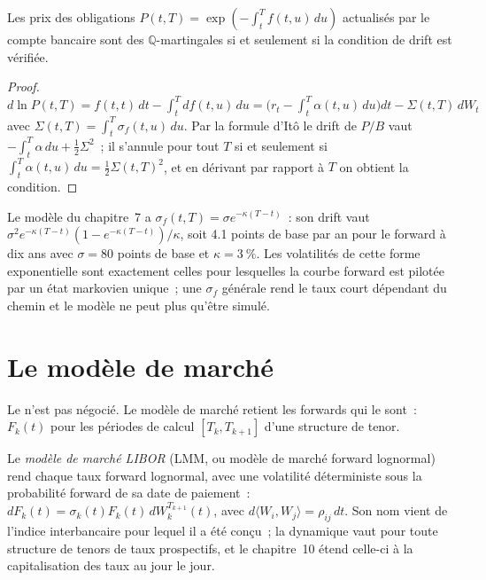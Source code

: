 \begin{proposition}\label{prop:rc:forward-rate-and-market-models:drift}
Les prix des obligations $P(t,T) = \exp(-\int_t^Tf(t,u)\,du)$ actualisés par le compte bancaire
sont des $\mathbb Q$-martingales si et seulement si la condition de drift est vérifiée.
\end{proposition}
\begin{proof}
$d\ln P(t,T) = f(t,t)\,dt-\int_t^Td f(t,u)\,du = \bigl(r_t-\int_t^T\alpha(t,u)\,du\bigr)dt
-\Sigma(t,T)\,dW_t$ avec $\Sigma(t,T)=\int_t^T\sigma_f(t,u)\,du$. Par la formule d'Itô
le drift de $P/B$ vaut $-\int_t^T\alpha\,du+\frac12\Sigma^2$~; il s'annule pour tout
$T$ si et seulement si $\int_t^T\alpha(t,u)\,du = \frac12\Sigma(t,T)^2$, et en dérivant par rapport à $T$
on obtient la condition.
\end{proof}

\begin{example}\label{ex:rc:forward-rate-and-market-models:hw}
Le modèle du chapitre~7 a $\sigma_f(t,T) = \sigma e^{-\kappa(T-t)}$~: son drift vaut
$\sigma^2e^{-\kappa(T-t)}(1-e^{-\kappa(T-t)})/\kappa$, soit 4.1 points de base par an pour le
forward à dix ans avec $\sigma = 80$ points de base et $\kappa = 3~\%$. Les volatilités de
cette forme exponentielle sont exactement celles pour lesquelles la courbe forward est pilotée par
un état markovien unique~; une $\sigma_f$ générale rend le taux court dépendant du chemin
et le modèle ne peut plus qu'être simulé.
\end{example}

\section{Le modèle de marché}

Le  n'est pas négocié. Le modèle de marché retient les forwards
qui le sont~: $F_k(t)$ pour les périodes de calcul $[T_k,T_{k+1}]$ d'une structure de tenor.

\begin{definition}\label{def:rc:forward-rate-and-market-models:lmm}
Le \emph{modèle de marché LIBOR} (LMM, ou modèle de marché forward
lognormal) rend chaque taux forward lognormal, avec une volatilité déterministe
sous la probabilité forward de sa date de paiement~:
$dF_k(t) = \sigma_k(t)F_k(t)\,dW^{T_{k+1}}_k(t)$, avec $d\langle W_i,W_j\rangle =
\rho_{ij}\,dt$. Son nom vient de l'indice interbancaire pour lequel il a été conçu~; la
dynamique vaut pour toute structure de tenors de taux prospectifs, et le chapitre~10
étend celle-ci à la capitalisation des taux au jour le jour.
\end{definition}

